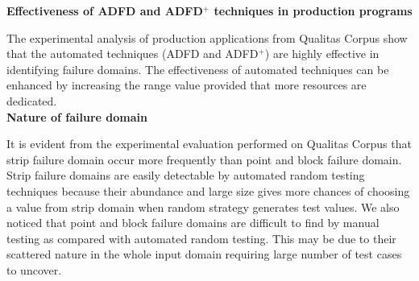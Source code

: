 \textbf{Effectiveness of ADFD and ADFD$^+$ techniques in production programs}

The experimental analysis of production applications from Qualitas Corpus show that the automated techniques (ADFD and ADFD$^+$) are highly effective in identifying failure domains. The effectiveness of automated techniques can be enhanced by increasing the range value provided that more resources are dedicated.\\


\textbf{Nature of failure domain}

It is evident from the experimental evaluation performed on Qualitas Corpus that strip failure domain occur more frequently than point and block failure domain. Strip failure domains are easily detectable by automated random testing techniques because their abundance and large size gives more chances of choosing a value from strip domain when random strategy generates test values. We also noticed that point and block failure domains are difficult to find by manual testing as compared with automated random testing. This may be due to their scattered nature in the whole input domain requiring large number of test cases to uncover. 





